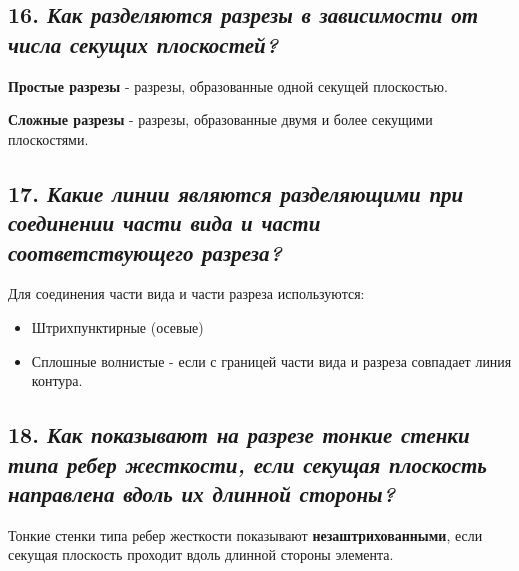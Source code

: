 \subsection*{16. \textit{Как разделяются разрезы в зависимости от числа секущих плоскостей?}}

\textbf{Простые разрезы} - разрезы, образованные одной секущей плоскостью.




\textbf{Сложные разрезы} - разрезы, образованные двумя и более секущими плоскостями.



\subsection*{17. \textit{Какие линии являются разделяющими при соединении части вида и части соответствующего разреза?}}

Для соединения части вида и части разреза используются:
\begin{itemize}

\item Штрихпунктирные (осевые)



\item Сплошные волнистые - если с границей части вида и разреза совпадает линия контура.




\end{itemize}
\subsection*{18. \textit{Как показывают на разрезе тонкие стенки типа ребер жесткости, если секущая плоскость направлена вдоль их длинной стороны?}}

Тонкие стенки типа ребер жесткости показывают \textbf{незаштрихованными}, если секущая плоскость проходит вдоль длинной стороны элемента.



